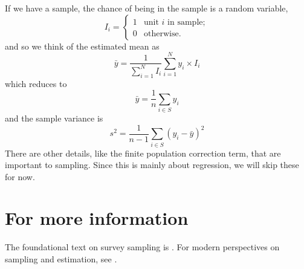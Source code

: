 If we have a sample, the chance of being in the sample is a random variable,
\begin{equation}
I_{i} = \left\{ \begin{array}{ll}
     1 & \mbox{unit } i \mbox{ in sample};\\
     0 & \mbox{otherwise}.\end{array} \right.
\end{equation}
and so we think of the estimated mean as
\begin{equation}
\bar{y} = \frac{1}{\sum_{i=1}^NI_i}\sum_{i=1}^Ny_i\times I_i
\end{equation}
which reduces to
\begin{equation}
\bar{y} = \frac{1}{n}\sum_{i\in S}y_i
\end{equation}
and the sample variance is
\begin{equation}
s^2 = \frac{1}{n-1}\sum_{i \in S}\left(y_i-\bar{y}\right)^2
\end{equation}
There are other details, like the finite population correction term, that are important to sampling. Since this is mainly about regression, we will skip these for now.
\section*{For more information}
The foundational text on survey sampling is \citep{kish1965survey}. For modern perspectives on sampling and estimation, see \citep{freedman2009statistical}.
